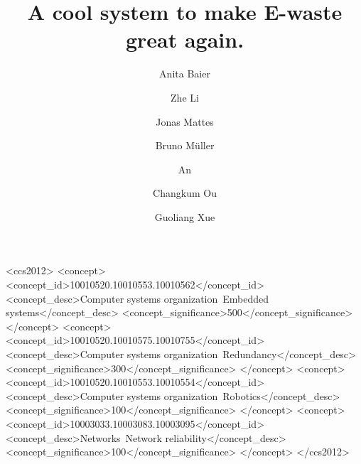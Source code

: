 \documentclass[sigchi-a, authorversion]{acmart}
\begin{document}
\title{A cool system to make E-waste great again.}

\author{Anita Baier}

\author{Zhe Li}

\author{Jonas Mattes}

\author{Bruno M\"uller}

\author{An}

\author{Changkum Ou}

\author{Guoliang Xue}

\renewcommand{\shortauthors}{F. Author et al.}


%
%
\begin{CCSXML}
<ccs2012>
 <concept>
  <concept_id>10010520.10010553.10010562</concept_id>
  <concept_desc>Computer systems organization~Embedded systems</concept_desc>
  <concept_significance>500</concept_significance>
 </concept>
 <concept>
  <concept_id>10010520.10010575.10010755</concept_id>
  <concept_desc>Computer systems organization~Redundancy</concept_desc>
  <concept_significance>300</concept_significance>
 </concept>
 <concept>
  <concept_id>10010520.10010553.10010554</concept_id>
  <concept_desc>Computer systems organization~Robotics</concept_desc>
  <concept_significance>100</concept_significance>
 </concept>
 <concept>
  <concept_id>10003033.10003083.10003095</concept_id>
  <concept_desc>Networks~Network reliability</concept_desc>
  <concept_significance>100</concept_significance>
 </concept>
</ccs2012>  
\end{CCSXML}
\end{document}
